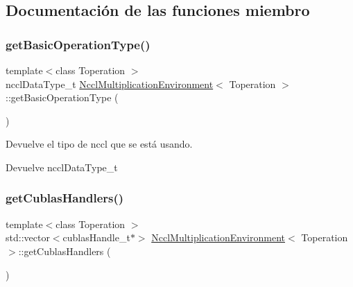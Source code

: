 \subsection{Documentación de las funciones miembro}
\mbox{\label{classNcclMultiplicationEnvironment_a6f985a18d27a9fd85196ec98d3108fa7}} 
\subsubsection{\texorpdfstring{get\+Basic\+Operation\+Type()}{getBasicOperationType()}}
{\footnotesize\ttfamily template$<$class Toperation $>$ \\
nccl\+Data\+Type\+\_\+t \hyperlink{classNcclMultiplicationEnvironment}{Nccl\+Multiplication\+Environment}$<$ Toperation $>$\+::get\+Basic\+Operation\+Type (\begin{DoxyParamCaption}{ }\end{DoxyParamCaption})}



Devuelve el tipo de nccl que se está usando. 

\begin{DoxyReturn}{Devuelve}
nccl\+Data\+Type\+\_\+t 
\end{DoxyReturn}
\mbox{\label{classNcclMultiplicationEnvironment_a225b8031310d177c5a9c25e53e1019ad}} 
\subsubsection{\texorpdfstring{get\+Cublas\+Handlers()}{getCublasHandlers()}}
{\footnotesize\ttfamily template$<$class Toperation $>$ \\
std\+::vector$<$cublas\+Handle\+\_\+t$\ast$$>$ \hyperlink{classNcclMultiplicationEnvironment}{Nccl\+Multiplication\+Environment}$<$ Toperation $>$\+::get\+Cublas\+Handlers (\begin{DoxyParamCaption}{ }\end{DoxyParamCaption})}



